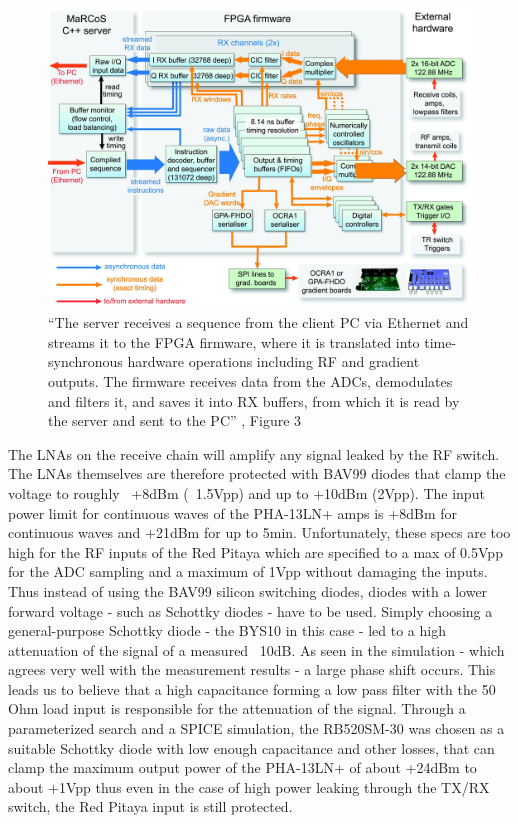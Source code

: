\begin{figure}[hbt]
    \centering
    \includegraphics{images/marcos.jpg}
    \caption{ \enquote{The server receives a sequence from the client PC via Ethernet and streams it to the FPGA firmware, where it is translated into time-synchronous hardware operations including RF and gradient outputs. The firmware receives data from the ADCs, demodulates and filters it, and saves it into RX buffers, from which it is read by the server and sent to the PC} \cite{negnevitskyMaRCoSOpensourceElectronic2023}, Figure 3}
\end{figure}

The LNAs on the receive chain will amplify any signal leaked by the RF switch. The LNAs themselves are therefore protected with BAV99 diodes that clamp the voltage to roughly ~+8dBm (~1.5Vpp) and up to +10dBm (2Vpp). The input power limit for continuous waves of the PHA-13LN+ amps is +8dBm for continuous waves and +21dBm for up to 5min. Unfortunately, these specs are too high for the RF inputs of the Red Pitaya which are specified to a max of 0.5Vpp for the ADC sampling and a maximum of 1Vpp without damaging the inputs. Thus instead of using the BAV99 silicon switching diodes, diodes with a lower forward voltage - such as Schottky diodes - have to be used. Simply choosing a general-purpose Schottky diode - the BYS10 in this case - led to a high attenuation of the signal of a measured ~10dB. As seen in the simulation - which agrees very well with the measurement results - a large phase shift occurs. This leads us to believe that a high capacitance forming a low pass filter with the 50 Ohm load input is responsible for the attenuation of the signal. Through a parameterized search and a SPICE simulation, the RB520SM-30 was chosen as a suitable Schottky diode with low enough capacitance and other losses, that can clamp the maximum output power of the PHA-13LN+ of about +24dBm to about +1Vpp thus even in the case of high power leaking through the TX/RX switch, the Red Pitaya input is still protected.

